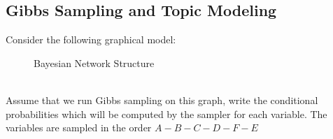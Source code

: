 \documentclass[11pt,addpoints,answers]{exam}
\numberwithin{equation}{section} %
\numberwithin{figure}{section} %
\numberwithin{table}{section} %
\begin{document}
\clearpage
\subsection{Gibbs Sampling and Topic Modeling}
\begin{questions}
\question[3] Consider the following graphical model:\\
\begin{figure}[h]
\centering
{}
\caption{Bayesian Network Structure}
\label{fig:bayesnet}
\end{figure}\\

Assume that we run Gibbs sampling on this graph, write the conditional probabilities which will be computed by the sampler for each variable. The variables are sampled in the order $A-B-C-D-F-E$
\begin{tcolorbox}[fit,height=8cm, width=15cm, blank, borderline={1pt}{-2pt}]
        \end{tcolorbox}


\end{questions}
\end{document}
